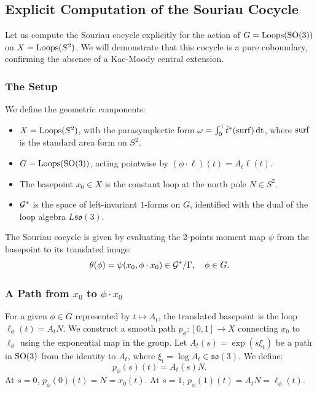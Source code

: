 \documentclass[11pt,reqno,letterpaper,twoside]{amsart}
\begin{document}
  \subsection{Explicit Computation of the Souriau Cocycle}
  
  Let us compute the Souriau cocycle explicitly for the action of $G = \operatorname{Loops}(\mathrm{SO}(3))$ on $X = \operatorname{Loops}(S^2)$.
  We will demonstrate that this cocycle is a pure coboundary,
  confirming the absence of a Kac-Moody central extension.
  
  \subsubsection{The Setup}
  We define the geometric components:
  \begin{itemize}[nosep]
    \item $X = \operatorname{Loops}(S^2)$,
    with the parasymplectic form $\omega = \int_0^1 \hat{t}^*(\operatorname{surf}) \, \mathrm{dt}$,
    where $\operatorname{surf}$ is the standard area form on $S^2$.
    \item $G = \operatorname{Loops}(\mathrm{SO}(3))$,
    acting pointwise by $(\phi \cdot \ell)(t) = A_t \ell(t)$.
    \item The basepoint $x_0 \in X$ is the constant loop at the north pole $N \in S^2$.
    \item $\mathcal{G}^*$ is the space of left-invariant $1$-forms on $G$,
    identified with the dual of the loop algebra $L\mathfrak{so}(3)$.
  \end{itemize}
  
  The Souriau cocycle is given by evaluating the 2-points moment map $\psi$ from the basepoint to its translated image:
  \[
    \theta(\phi) = \psi(x_0, \phi \cdot x_0) \in \mathcal{G}^*/\Gamma, \quad \phi \in G.
    \]
  
  \subsubsection{A Path from $x_0$ to $\phi \cdot x_0$}
  For a given $\phi \in G$ represented by $t \mapsto A_t$,
  the translated basepoint is the loop $\ell_\phi(t) = A_t N$.
  We construct a smooth path $p_\phi : [0,1] \to X$ connecting $x_0$ to $\ell_\phi$ using the exponential map in the group.
  Let $A_t(s) = \exp(s \xi_t)$ be a path in $\mathrm{SO}(3)$ from the identity to $A_t$,
  where $\xi_t = \log A_t \in \mathfrak{so}(3)$.
  We define:
  \[
    p_\phi(s)(t) = A_t(s) N.
    \]
  At $s=0$, $p_\phi(0)(t) = N = x_0(t)$.
  At $s=1$, $p_\phi(1)(t) = A_t N = \ell_\phi(t)$.
  
\end{document}

